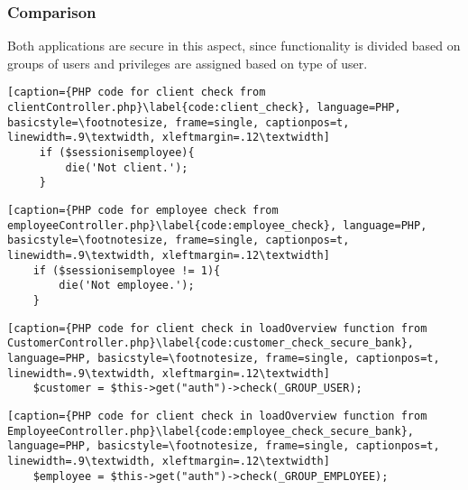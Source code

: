 \subsubsection{Comparison}
Both applications are secure in this aspect, since functionality is divided based on groups of users and privileges are assigned based on type of user.

\begin{lstlisting}[caption={PHP code for client check from clientController.php}\label{code:client_check}, language=PHP, basicstyle=\footnotesize, frame=single, captionpos=t, linewidth=.9\textwidth, xleftmargin=.12\textwidth]
     if ($sessionisemployee){
         die('Not client.');
     }
\end{lstlisting}

\begin{lstlisting}[caption={PHP code for employee check from employeeController.php}\label{code:employee_check}, language=PHP, basicstyle=\footnotesize, frame=single, captionpos=t, linewidth=.9\textwidth, xleftmargin=.12\textwidth]
    if ($sessionisemployee != 1){
        die('Not employee.');
    }
\end{lstlisting}

\begin{lstlisting}[caption={PHP code for client check in loadOverview function from CustomerController.php}\label{code:customer_check_secure_bank}, language=PHP, basicstyle=\footnotesize, frame=single, captionpos=t, linewidth=.9\textwidth, xleftmargin=.12\textwidth]
    $customer = $this->get("auth")->check(_GROUP_USER);
\end{lstlisting}

\begin{lstlisting}[caption={PHP code for client check in loadOverview function from EmployeeController.php}\label{code:employee_check_secure_bank}, language=PHP, basicstyle=\footnotesize, frame=single, captionpos=t, linewidth=.9\textwidth, xleftmargin=.12\textwidth]
    $employee = $this->get("auth")->check(_GROUP_EMPLOYEE);
\end{lstlisting}

\clearpage